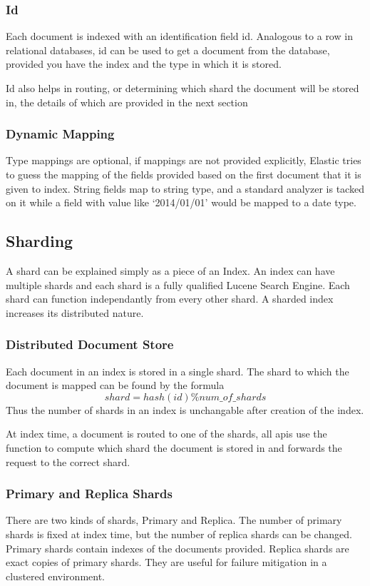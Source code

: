 \documentclass[12pt]{article}
\begin{document}
			\subsubsection{Id}
			Each document is indexed with an identification field id. Analogous to a row in relational databases, id can be used to get a document from the database, provided you have the index and the type in which it is stored. 

			Id also helps in routing, or determining which shard the document will be stored in, the details of which are provided in the next section

			\subsubsection{Dynamic Mapping}
			Type mappings are optional, if mappings are not provided explicitly, Elastic tries to guess the mapping of the fields provided based on the first document that it is given to index. String fields map to string type, and a standard analyzer is tacked on it while a field with value like `2014/01/01' would be mapped to a date type.

		\subsection{Sharding}
			A shard can be explained simply as a piece of an Index. An index can have multiple shards and each shard is a fully qualified Lucene Search Engine. Each shard can function independantly from every other shard. A sharded index increases its distributed nature.
			\subsubsection{Distributed Document Store}
				Each document in an index is stored in a single shard. The shard to which the document is mapped can be found by the formula \[ shard = hash(id) \% num\_of\_shards\] Thus the number of shards in an index is unchangable after creation of the index.

				At index time, a document is routed to one of the shards, all \ac{api}s use the function to compute which shard the document is stored in and forwards the request to the correct shard.
			\subsubsection{Primary and Replica Shards}
				There are two kinds of shards, Primary and Replica. The number of primary shards is fixed at index time, but the number of replica shards can be changed. Primary shards contain indexes of the documents provided. Replica shards are exact copies of primary shards. They are useful for failure mitigation in a clustered environment.
\end{document}
